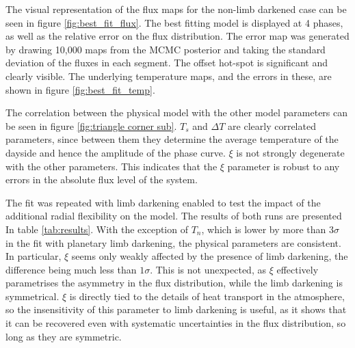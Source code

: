 \documentclass[a4paper,fleqn,usenatbib]{mnras}
\begin{document}
The visual representation of the flux maps for the non-limb darkened case can be seen in figure \ref{fig:best_fit_flux}. The best fitting model is displayed at 4 phases, as well as the relative error on the flux distribution. The error map was generated by drawing 10,000 maps from the MCMC posterior and taking the standard deviation of the fluxes in each segment. The offset hot-spot is significant and clearly visible. The underlying temperature maps, and the errors in these, are shown in figure \ref{fig:best_fit_temp}.

The correlation between the physical model with the other model parameters can be seen in figure \ref{fig:triangle corner sub}. $T_s$ and $\Delta T$ are clearly correlated parameters, since between them they determine the average temperature of the dayside and hence the amplitude of the phase curve. $\xi$ is not strongly degenerate with the other parameters. This indicates that the $\xi$ parameter is robust to any errors in the absolute flux level of the system.

The fit was repeated with limb darkening enabled to test the impact of the additional radial flexibility on the model. The results of both runs are presented In table \ref{tab:results}. With the exception of $T_n$, which is lower by more than $3\sigma$ in the fit with planetary limb darkening, the physical parameters are consistent. In particular, $\xi$ seems only weakly affected by the presence of limb darkening, the difference being much less than $1\sigma$. This is not unexpected, as $\xi$ effectively parametrises the asymmetry in the flux distribution, while the limb darkening is symmetrical. $\xi$ is directly tied to the details of heat transport in the atmosphere, so the insensitivity of this parameter to limb darkening is useful, as it shows that it can be recovered even with systematic uncertainties in the flux distribution, so long as they are symmetric.
\end{document}
